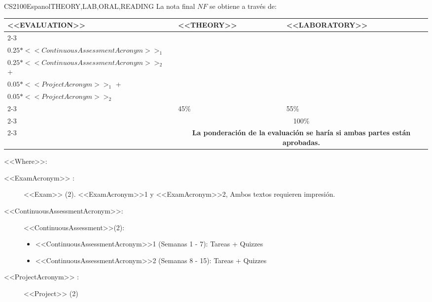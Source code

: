  \begin{evaluation}{CS2100}{Espanol}{THEORY,LAB,ORAL,READING}
  La nota final $NF$ se obtiene a través de:

  \begin{tabularx}{0.9\textwidth}{|X|p{}|p{}|} \hline
    \multirow{4}{*}{\uppercase{<<Evaluation>>}} & \uppercase{<<Theory>>} & \uppercase{<<Laboratory>>} \\ \cline{2-3}
    & %
        \begin{minipage}{0.95\textwidth}
        \begin{tabular}{l}
            $0.20*<<ExamAcronym>>_{1}$  + \\
            $0.25*<<ContinuousAssessmentAcronym>>_{1}$
            \end{tabular} 
        \end{minipage} 
    & %
        \begin{minipage}{0.95\textwidth}
        \begin{tabular}{l}
            $0.20*<<ExamAcronym>>_{1}$  + \\
            $0.25*<<ContinuousAssessmentAcronym>>_{2}$  +\\
            $0.05*<<ProjectAcronym>>_{1}$ + \\
            $0.05*<<ProjectAcronym>>_{2}$
            \end{tabular} 
        \end{minipage}                 \\ \cline{2-3}
    
    & %
    45\% 
    & %
    55\% \\ \cline{2-3}
    & \multicolumn{2}{c|}{100\%}  \\ \cline{2-3}
    & \multicolumn{2}{c|}{\textbf{La ponderación de la evaluación se haría si ambas partes están aprobadas.}}  \\ \hline
    \end{tabularx}
    
    \vspace{2mm}
    \noindent <<Where>>:
    \begin{description}
        \item[<<ExamAcronym>> :] <<Exam>> (2). <<ExamAcronym>>1 y <<ExamAcronym>>2, Ambos textos requieren impresión.
        \item[<<ContinuousAssessmentAcronym>>:]<<ContinuousAssessment>>(2):
        \begin{itemize}
                \item <<ContinuousAssessmentAcronym>>1 (Semanas 1 - 7): Tareas + Quizzes
                \item <<ContinuousAssessmentAcronym>>2 (Semanas 8 - 15): Tareas + Quizzes
        \end{itemize}
        \item[<<ProjectAcronym>> :] <<Project>> (2)
    \end{description}


\end{evaluation}
